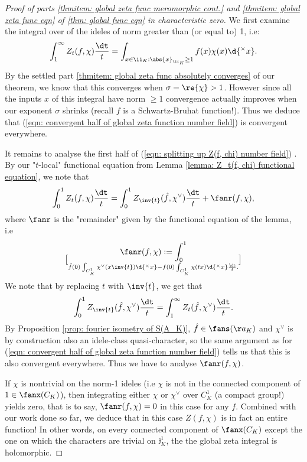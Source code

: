 \documentclass[11pt, x11names, openany]{book}
\begin{document}
\begin{proof}[Proof of parts \ref{thmitem: global zeta func meromorphic cont.} and \ref{thmitem: global zeta func eqn} of \ref{thm: global func eqn} in characteristic zero]
We first examine the integral over of the ideles of norm greater than (or equal to) 1, i.e:
\begin{equation}
    \label{eqn: convergent half of global zeta function number field}
    \int_1^\infty Z_t(f, \chi) \frac{\dt}{t} = \int_{x \in \ii_K : \abs{x}_{\ii_K} \geq 1} f(x) \chi(x) \d{^\times x}.
\end{equation}
By the settled part \ref{thmitem: global zeta func absolutely converges} of our theorem, we know that this converges when $\sigma = \re{\chi} > 1$. However since all the inputs $x$ of this integral have norm $\geq 1$ convergence actually improves when our exponent $\sigma$ shrinks (recall $f$ is a Schwartz-Bruhat function!). Thus we deduce that (\ref{eqn: convergent half of global zeta function number field}) is convergent everywhere.

It remains to analyse the first half of (\ref{eqn: splitting up Z(f, chi) number field}) . By our "$t$-local" functional equation from Lemma \ref{lemma: Z_t(f, chi) functional equation}, we note that
\begin{equation}
    \label{eqn: splitting up integral of Z_t from 0 to 1}
    \int^1_0 Z_t(f, \chi) \frac{\dt}{t} = \int_0^1 Z_{\inv{t}}(\hat{f}, \chi^\lor) \frac{\dt}{t} + \fanr(f, \chi),
\end{equation}
where $\fanr$ is the "remainder" given by the functional equation of the lemma, i.e
\begin{equation*}
    \fanr(f, \chi) := \int^1_{0} \brack{\hat{f}(0) \int_{C^1_K}\chi^\lor(x \inv{t})\d{^\times x} - f(0) \int_{C^1_K}\chi(tx)\d{^\times x} } \frac{\dt}{t}.
\end{equation*}
 We note that by replacing $t$ with $\inv{t}$, we get that
 \begin{equation*}
    \int^1_0 Z_{\inv{t}}(\hat{f}, \chi^\lor) \frac{\dt}{t} = \int^\infty_1 Z_t(\hat{f}, \chi^\lor) \frac{\dt}{t}.
 \end{equation*}
 By Proposition \ref{prop: fourier isometry of S(A_K)}, $\hat{f} \in \fans(\aa_K)$ and $\chi^\lor$ is by construction also an idele-class quasi-character, so the same argument as for  (\ref{eqn: convergent half of global zeta function number field}) tells us that this is also convergent everywhere. Thus we have to analyse $\fanr(f, \chi)$.

 If $\chi$ is nontrivial on the norm-1 ideles (i.e $\chi$ is not in the connected component of $1 \in \fanx(C_K)$), then integrating either $\chi$ or $\chi^\lor$ over $C^1_K$ (a compact group!) yields zero, that is to say, $\fanr(f, \chi) = 0$ in this case for any $f$. Combined with our work done so far, we deduce that in this case $Z(f, \chi)$ is in fact an entire function! In other words, on every connected component of $\fanx(C_K)$ except the one on which the characters are trivial on $\ii^1_K$, the the global zeta integral is holomorphic.


\end{proof}
\end{document}

